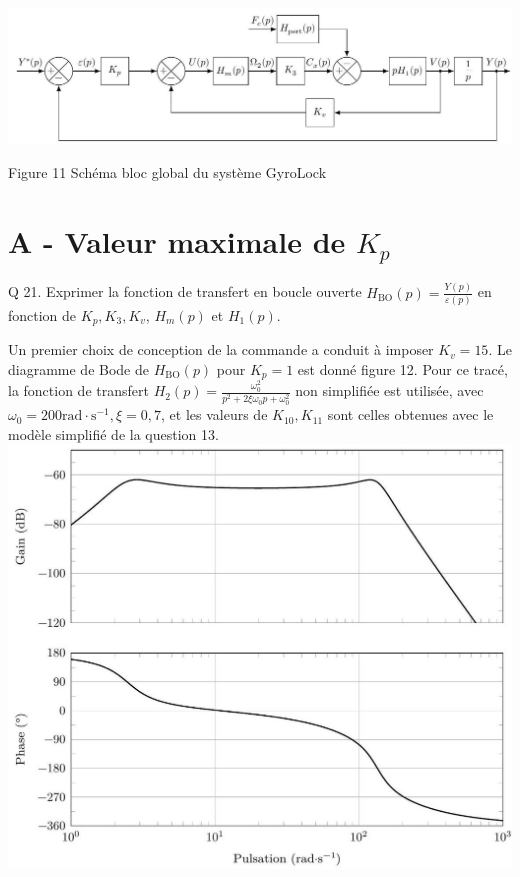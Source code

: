 \documentclass[10pt]{article}
\begin{document}
\begin{center}
\includegraphics[max width=\textwidth]{2023_07_26_54f5e859400a10e656ddg-07(1)}
\end{center}

Figure 11 Schéma bloc global du système GyroLock

\section{A - Valeur maximale de $K_{p}$}
Q 21. Exprimer la fonction de transfert en boucle ouverte $H_{\mathrm{BO}}(p)=\frac{Y(p)}{\varepsilon(p)}$ en fonction de $K_{p}, K_{3}, K_{v}$, $H_{m}(p)$ et $H_{1}(p)$.

Un premier choix de conception de la commande a conduit à imposer $K_{v}=15$. Le diagramme de Bode de $H_{\mathrm{BO}}(p)$ pour $K_{p}=1$ est donné figure 12. Pour ce tracé, la fonction de transfert $H_{2}(p)=\frac{\omega_{0}^{2}}{p^{2}+2 \xi \omega_{0} p+\omega_{0}^{2}}$ non simplifiée est utilisée, avec $\omega_{0}=200 \mathrm{rad} \cdot \mathrm{s}^{-1}, \xi=0,7$, et les valeurs de $K_{10}, K_{11}$ sont celles obtenues avec le modèle simplifié de la question 13.
\includegraphics[max width=\textwidth, center]{2023_07_26_54f5e859400a10e656ddg-08(1)}
\end{document}
